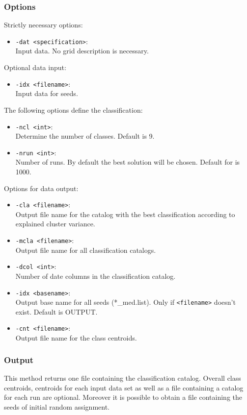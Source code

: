 \documentclass[12pt, oneside, a4paper, headsepline, plainheadsepline]{scrbook}
\begin{document}
\subsubsection*{Options}
Strictly necessary options:
\begin{itemize}
 \item \verb+-dat <specification>+:\\ Input data. No grid description is necessary.
\end{itemize}
Optional data input:
\begin{itemize}
 \item \verb+-idx <filename>+:\\ Input data for seeds.
\end{itemize}
The following options define the classification:
\begin{itemize}
 \item \verb+-ncl <int>+:\\ 
 Determine the number of classes. Default is 9.  
 \item \verb+-nrun <int>+:\\ 	
 Number of runs. By default the best solution will be chosen. Default for is 1000.
\end{itemize}
Options for data output:
\begin{itemize}
 \item \verb+-cla <filename>+:\\ Output file name for the catalog with the best classification according to explained cluster variance.
 \item \verb+-mcla <filename>+:\\ Output file name for all classification catalogs.
 \item \verb+-dcol <int>+:\\ Number of date columns in the classification catalog.
 \item \verb+-idx <basename>+:\\ Output base name for all seeds (*\_med.list). Only if \verb+<filename>+ doesn't exist. Default is OUTPUT.
 \item \verb+-cnt <filename>+:\\ Output file name for the class centroids.
\end{itemize}

\subsubsection*{Output}
This method returns one file containing the classification catalog. 
Overall class centroids, centroids for each input data set as well as a file containing a catalog for each run are optional. Moreover it is possible to obtain a file containing the seeds of initial random assignment.
\end{document}
